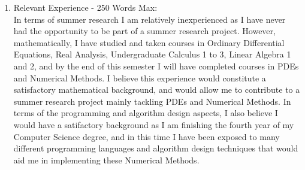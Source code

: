 \documentclass[11pt]{article}
\begin{document}
\begin{enumerate}
\item Relevant Experience - 250 Words Max: \\
In terms of summer research I am relatively inexperienced as I have never had the opportunity to be part of a summer research project. However, mathematically,
I have studied and taken courses in Ordinary Differential Equations, Real Analysis, Undergraduate Calculus 1 to 3, Linear Algebra 1 and 2, and by the end of
this semester I will have completed courses in PDEs and Numerical Methods. I believe this experience would constitute a satisfactory mathematical
background, and would allow me to contribute to a summer research project mainly tackling PDEs and Numerical Methods. In terms of the programming and algorithm design
aspects, I also believe I would have a satifactory background as I am finishing the fourth year of my Computer Science degree, and in this time I have been
exposed to many different programming languages and algorithm design techniques that would aid me in implementing these Numerical Methods.

\end{enumerate}
\end{document}
